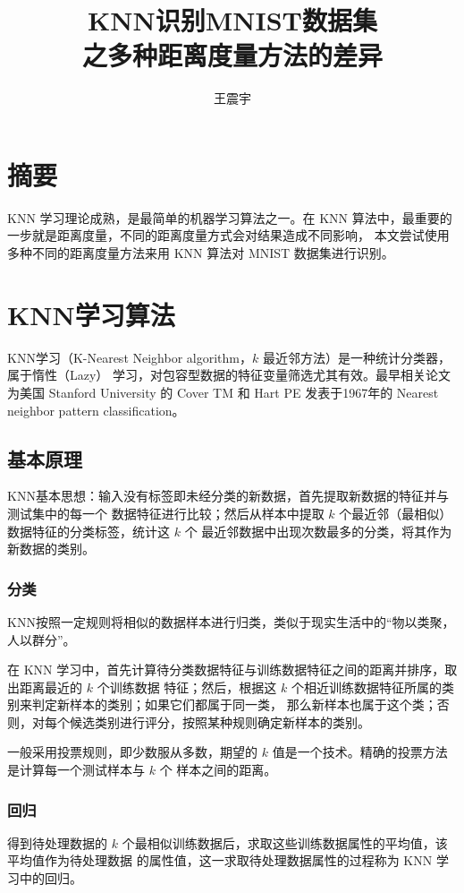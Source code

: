 \documentclass{cugrep}
\title{KNN识别MNIST数据集\\之多种距离度量方法的差异}
\author{王震宇}
\begin{document}
\maketitle
{}
\tableofcontents
\thispagestyle{plain}
\cleardoublepage
{}

\section*{摘要}
KNN 学习理论成熟，是最简单的机器学习算法之一。在 KNN 算法中，最重要的一步就是距离度量，不同的距离度量方式会对结果造成不同影响，
本文尝试使用多种不同的距离度量方法来用 KNN 算法对 MNIST 数据集进行识别。
\section{KNN学习算法}
 KNN学习（K-Nearest Neighbor algorithm，$k$ 最近邻方法）是一种统计分类器，属于惰性（Lazy）
 学习，对包容型数据的特征变量筛选尤其有效。最早相关论文为美国 Stanford University 的 
 Cover TM 和 Hart PE 发表于1967年的 Nearest neighbor pattern classification。
 \subsection{基本原理}
 KNN基本思想：输入没有标签即未经分类的新数据，首先提取新数据的特征并与测试集中的每一个
 数据特征进行比较；然后从样本中提取 $k$ 个最近邻（最相似）数据特征的分类标签，统计这 $k$ 个
 最近邻数据中出现次数最多的分类，将其作为新数据的类别。
 \subsubsection{分类}
KNN按照一定规则将相似的数据样本进行归类，类似于现实生活中的“物以类聚，人以群分”。

在 KNN 学习中，首先计算待分类数据特征与训练数据特征之间的距离并排序，取出距离最近的 $k$ 个训练数据
特征；然后，根据这 $k$ 个相近训练数据特征所属的类别来判定新样本的类别；如果它们都属于同一类，
那么新样本也属于这个类；否则，对每个候选类别进行评分，按照某种规则确定新样本的类别。

一般采用投票规则，即少数服从多数，期望的 $k$ 值是一个技术。精确的投票方法是计算每一个测试样本与 $k$ 个
样本之间的距离。
\subsubsection{回归}
得到待处理数据的 $k$ 个最相似训练数据后，求取这些训练数据属性的平均值，该平均值作为待处理数据
的属性值，这一求取待处理数据属性的过程称为 KNN 学习中的回归。
\end{document}
